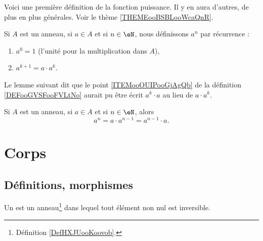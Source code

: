Voici une première définition de la fonction puissance. Il y en aura d'autres, de plus en plus générales. Voir le thème \ref{THEMEooBSBLooWcaQnR}.
\begin{definition}\label{DEFooGVSFooFVLtNo}
    Si \( A\) est un anneau, si \( a\in A\) et si \( n\in \eN\), nous définissons \( a^n\) par récurrence :
    \begin{enumerate}
        \item
            \( a^0=1\) (l'unité pour la multiplication dans \( A\)),
        \item       \label{ITEMooOUIPooGjAgQb}
            \( a^{k+1}=a\cdot a^{k}\).
    \end{enumerate}
\end{definition}

Le lemme suivant dit que le point \ref{ITEMooOUIPooGjAgQb} de la définition \ref{DEFooGVSFooFVLtNo} aurait pu être écrit \( a^k\cdot a\) au lieu de \( a\cdot a^k\).
\begin{lemma}        \label{LEMooWPARooYLZlzr}
    Si \( A\) est un anneau, si \( a\in A\) et si \( n\in \eN\), alors
    \begin{equation}
        a^n=a\cdot a^{n-1}=a^{n-1}\cdot a.
    \end{equation}
\end{lemma}


\section{Corps}

\subsection{Définitions, morphismes}

\begin{definition}  \label{DefTMNooKXHUd}
    Un  est un anneau\footnote{Définition \ref{DefHXJUooKoovob}.} dans lequel tout élément non nul est inversible.
\end{definition}

